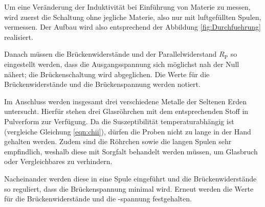 Um eine Veränderung der Induktivität bei Einführung von Materie zu messen, wird zuerst 
die Schaltung ohne jegliche Materie, also nur mit luftgefüllten Spulen, vermessen. 
Der Aufbau wird also entsprechend der Abbildung \ref{fig:Durchfuehrung} realisiert. 

Danach müssen die Brückenwiderstände und der Parallelwiderstand $R_\text{P}$ so eingestellt werden, dass die Ausgangsspannung sich möglichst nah der Null nähert;
die Brückenschaltung wird abgeglichen. 
Die Werte für die Brückenwiderstände und die Brückenspannung werden notiert.

Im Anschluss werden insgesamt drei verschiedene Metalle der Seltenen Erden untersucht.
Hierfür stehen drei Glasröhrchen mit dem entsprechenden Stoff in Pulverform zur Verfügung. 
Da die Suszeptibilität temperaturabhängig ist (vergleiche Gleichung \eqref{eqn:chii}), dürfen die Proben nicht zu 
lange in der Hand gehalten werden. 
Zudem sind die Röhrchen sowie die langen Spulen sehr empfindlich, weshalb diese mit Sorgfalt behandelt werden müssen, um 
Glasbruch oder Vergleichbares zu verhindern. 

Nacheinander werden diese in eine Spule eingeführt und die Brückenwiderstände so reguliert, dass die Brückenspannung 
minimal wird. 
Erneut werden die Werte für die Brückenwiderstände und die -spannung festgehalten. 
